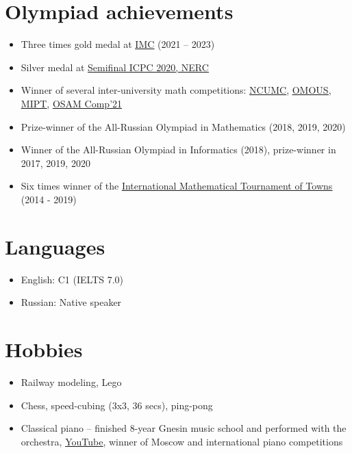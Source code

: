 \documentclass[letterpaper,11pt]{article}
\newcommand{\resumeItemListStart}{\begin{itemize}}
\newcommand{\resumeItemListEnd}{\end{itemize}\vspace{-8pt}}
\newcommand{\resumeItem}[1]{\item\small{{#1 \vspace{-2pt}}}}
\newcommand{\resumeSubItem}[1]{\resumeItem{#1}\vspace{-4pt}}
\begin{document}
\section{Olympiad achievements}

\resumeItemListStart
\resumeSubItem{Three times gold medal at \href{https://imc-math.org.uk}{\underline{IMC}} (2021 -- 2023)}
\resumeSubItem{Silver medal at \href{https://neerc.ifmo.ru/archive/2020.html}{\underline{Semifinal ICPC 2020, NERC}}}
\resumeSubItem{Winner of several inter-university math competitions: \href{https://iuhd.edu.tm/competition/44}{\underline{NCUMC}}, \href{https://iuhd.edu.tm/competition/45}{\underline{OMOUS}}, \href{http://www.rkarasev.ru/note/66}{\underline{MIPT}}, \href{https://cs.hse.ru/en/announcements/504365867.html}{\underline{OSAM Comp'21}}}
\resumeSubItem{Prize-winner of the All-Russian Olympiad in Mathematics (2018, 2019, 2020)}
\resumeSubItem{Winner of the All-Russian Olympiad in Informatics (2018), prize-winner in 2017, 2019, 2020}
\resumeSubItem{Six times winner of the \href{https://www.turgor.ru/en/}{\underline{International Mathematical Tournament of Towns}} (2014 - 2019)}
\resumeItemListEnd


\section{Languages}

\resumeItemListStart
\resumeSubItem{English: C1 (IELTS 7.0)}
\resumeSubItem{Russian: Native speaker}
\resumeItemListEnd


\section{Hobbies}

\resumeItemListStart
\resumeSubItem{Railway modeling, Lego}
\resumeSubItem{Chess, speed-cubing (3x3, 36 secs), ping-pong}
\resumeSubItem{Classical piano -- finished 8-year Gnesin music school and performed with the orchestra, \href{https://www.youtube.com/user/FeodorKuyanov/playlists}{\underline{YouTube}}, winner of Moscow and international piano competitions}
\resumeItemListEnd
\end{document}
